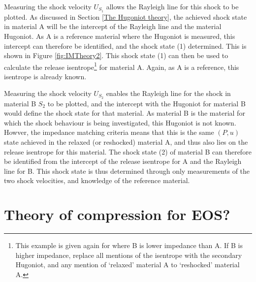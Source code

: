 Measuring the shock velocity $U_{S_1}$ allows the Rayleigh line for this shock to be plotted. As discussed in Section \ref{The Hugoniot theory}, the achieved shock state in material A will be the intercept of the Rayleigh line and the material Hugoniot. As A is a reference material where the Hugoniot is measured, this intercept can therefore be identified, and the shock state (1) determined. This is shown in Figure \ref{fig:IMTheory2}. This shock state (1) can then be used to calculate the release isentrope\footnote{This example is given again for where B is lower impedance than A. If B is higher impedance, replace all mentions of the isentrope with the secondary Hugoniot, and any mention of `relaxed' material A to `reshocked' material A.} for material A. Again, as A is a reference, this isentrope is already known.

Measuring the shock velocity $U_{S_2}$ enables the Rayleigh line for the shock in material B $S_2$ to be plotted, and the intercept with the Hugoniot for material B would define the shock state for that material. As material B is the material for which the shock behaviour is being investigated, this Hugoniot is not known. Howver, the impedance matching criteria means that this is the same $(P, u)$ state achieved in the relaxed (or reshocked) material A, and thus also lies on the release isentrope for this material. The shock state (2) of material B can therefore be identified from the intercept of the release isentrope for A and the Rayleigh line for B. This shock state is thus determined through only measurements of the two shock velocities, and knowledge of the reference material.

\section{Theory of compression for EOS?}